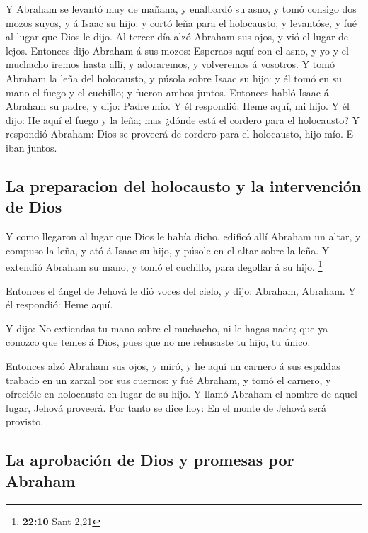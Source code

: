  Y Abraham se levantó muy de mañana, y enalbardó su asno, y
tomó consigo dos mozos suyos, y á Isaac su hijo: y cortó leña para el
holocausto, y levantóse, y fué al lugar que Dios le dijo. 
Al tercer día alzó Abraham sus ojos, y vió el lugar de lejos.
 Entonces dijo Abraham á sus mozos: Esperaos aquí con el
asno, y yo y el muchacho iremos hasta allí, y adoraremos, y volveremos á
vosotros.  Y tomó Abraham la leña del holocausto, y púsola
sobre Isaac su hijo: y él tomó en su mano el fuego y el cuchillo; y
fueron ambos juntos.  Entonces habló Isaac á Abraham su
padre, y dijo: Padre mío. Y él respondió: Heme aquí, mi hijo. Y él dijo:
He aquí el fuego y la leña; mas ¿dónde está el cordero para el
holocausto?  Y respondió Abraham: Dios se proveerá de
cordero para el holocausto, hijo mío. E iban juntos.

\hypertarget{la-preparacion-del-holocausto-y-la-intervenciuxf3n-de-dios}{%
\subsection{La preparacion del holocausto y la intervención de
Dios}\label{la-preparacion-del-holocausto-y-la-intervenciuxf3n-de-dios}}

 Y como llegaron al lugar que Dios le había dicho, edificó
allí Abraham un altar, y compuso la leña, y ató á Isaac su hijo, y
púsole en el altar sobre la leña.  Y extendió Abraham su
mano, y tomó el cuchillo, para degollar á su hijo. \footnote{\textbf{22:10}
  Sant 2,21}

 Entonces el ángel de Jehová le dió voces del cielo, y
dijo: Abraham, Abraham. Y él respondió: Heme aquí.

 Y dijo: No extiendas tu mano sobre el muchacho, ni le
hagas nada; que ya conozco que temes á Dios, pues que no me rehusaste tu
hijo, tu único.

 Entonces alzó Abraham sus ojos, y miró, y he aquí un
carnero á sus espaldas trabado en un zarzal por sus cuernos: y fué
Abraham, y tomó el carnero, y ofrecióle en holocausto en lugar de su
hijo.  Y llamó Abraham el nombre de aquel lugar, Jehová
proveerá. Por tanto se dice hoy: En el monte de Jehová será provisto.

\hypertarget{la-aprobaciuxf3n-de-dios-y-promesas-por-abraham}{%
\subsection{La aprobación de Dios y promesas por
Abraham}\label{la-aprobaciuxf3n-de-dios-y-promesas-por-abraham}}

